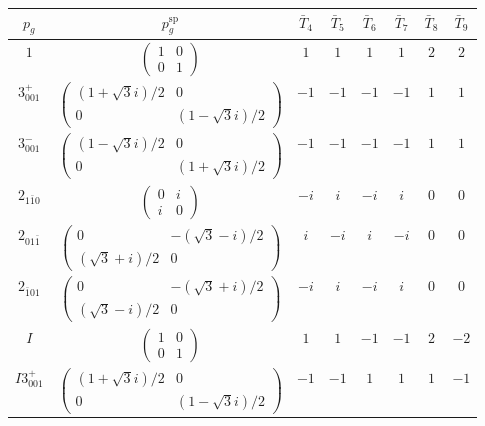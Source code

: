 \documentclass[3p,preprint]{elsarticle}
\begin{document}
\begin{table}[H]
	\begin{tabular}{|c|c||c|c|c|c|c|c|} \hline
		$p_g$ & $p_g^{\text{sp}}$ & $\bar{T}_4$ & $\bar{T}_5$ & $\bar{T}_6$ & $\bar{T}_7$ & $\bar{T}_8$ & $\bar{T}_9$  \\ \hline \hline
		$1$ & 							$\left(\begin{array}{cc} 1&0 \\ 0&1 \end{array}\right)$ & $1$ &  $1$ &  $1$ &  $1$ &  $2$ &  $2$ \\ \hline
		$3^{+}_{001}$ &				$\left(\begin{array}{cc} (1+\sqrt{3}i)/2&0 \\ 0&(1-\sqrt{3}i)/2 \end{array}\right)$ & $-1$ & $-1$ & $-1$ & $-1$ & $1$ & $1$ \\ \hline
		$3^{-}_{001}$ &				$\left(\begin{array}{cc} (1-\sqrt{3}i)/2&0 \\ 0&(1+\sqrt{3}i)/2 \end{array}\right)$ &$-1$ & $-1$ & $-1$ & $-1$ & $1$ & $1$ \\ \hline
		$2_{1\bar{1}0}$ &					$\left(\begin{array}{cc} 0&i \\ i&0 \end{array}\right)$ & $-i$ & $i$ & $-i$ & $i$ & $0$ & $0$ \\ \hline
		$2_{01\bar{1}}$ &				$\left(\begin{array}{cc} 0&-(\sqrt{3}-i)/2 \\ (\sqrt{3}+i)/2&0 \end{array}\right)$ & $i$ & $-i$ & $i$ & $-i$ & $0$ & $0$ \\ \hline
		$2_{\bar{1}01}$ &		$\left(\begin{array}{cc} 0&-(\sqrt{3}+i)/2 \\ (\sqrt{3}-i)/2&0 \end{array}\right)$ & $-i$ & $i$ & $-i$ & $i$ & $0$ & $0$ \\ \hline
		$I$ & 					$\left(\begin{array}{cc} 1&0 \\ 0&1 \end{array}\right)$ & $1$ & $1$ & $-1$ & $-1$ & $2$ & $-2$ \\ \hline
		$I3^{+}_{001}$ &		$\left(\begin{array}{cc} (1+\sqrt{3}i)/2&0 \\ 0&(1-\sqrt{3}i)/2 \end{array}\right)$ &$-1$ & $-1$ & $1$ & $1$ & $1$ & $-1$ \\ \hline

\end{tabular}
\end{table}
\end{document}
